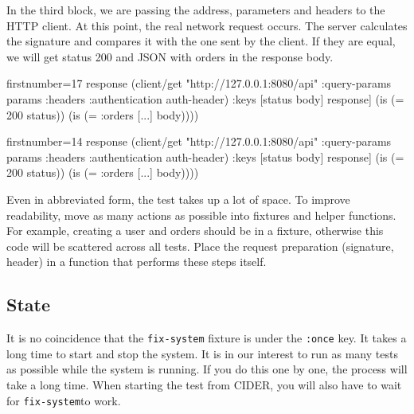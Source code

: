 \fi

\wavebottom

In the third block, we are passing the address, parameters and headers to the HTTP client. At this point, the real network request occurs. The server calculates the signature and compares it with the one sent by the client. If they are equal, we will get status 200 and JSON with orders in the response body.

\wavetop

\ifx\DEVICETYPE\MOBILE

\begin{english}
  \begin{clojure/lines*}{firstnumber=17}
    response
    (client/get
      "http://127.0.0.1:8080/api"
      {:query-params params
       :headers {:authentication
                 auth-header}})
    {:keys [status body]} response]
(is (= 200 status))
(is (= {:orders [...]} body))))
  \end{clojure/lines*}
\end{english}

\else

\begin{english}
  \begin{clojure/lines*}{firstnumber=14}
        response (client/get "http://127.0.0.1:8080/api"
                   {:query-params params
                    :headers {:authentication auth-header}})
        {:keys [status body]} response]
    (is (= 200 status))
    (is (= {:orders [...]} body))))
  \end{clojure/lines*}
\end{english}

\fi

Even in abbreviated form, the test takes up a lot of space. To improve readability, move as many actions as possible into fixtures and helper functions. For example, creating a user and orders should be in a fixture, otherwise this code will be scattered across all tests. Place the request preparation (signature, header) in a function that performs these steps itself.

\subsection{State}

It is no coincidence that the \verb|fix-system| fixture is under the \verb|:once| key. It takes a long time to start and stop the system. It is in our interest to run as many tests as possible while the system is running. If you do this one by one, the process will take a long time. When starting the test from CIDER, you will also have to wait for \verb|fix-system|to work.

